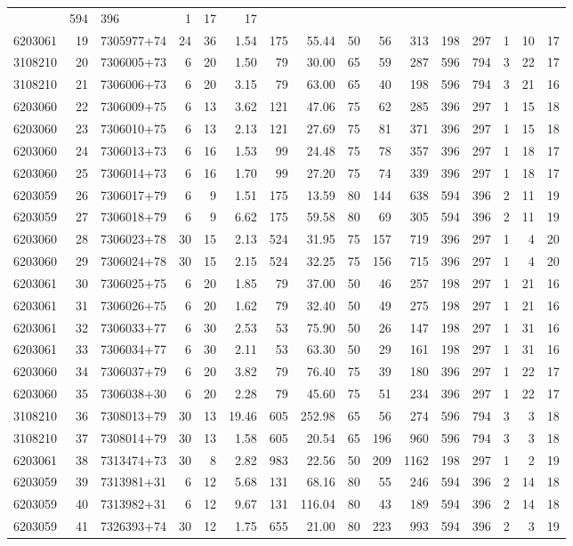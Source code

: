 \documentclass[
]{article}
\begin{document}
\begin{longtable}[]{@{}rrlrrrrrrrrrrrrr@{}}
& 594 & 396 & 1 & 17 & 17\tabularnewline
6203061 & 19 & 7305977+74 & 24 & 36 & 1.54 & 175 & 55.44 & 50 & 56 & 313
& 198 & 297 & 1 & 10 & 17\tabularnewline
3108210 & 20 & 7306005+73 & 6 & 20 & 1.50 & 79 & 30.00 & 65 & 59 & 287 &
596 & 794 & 3 & 22 & 17\tabularnewline
3108210 & 21 & 7306006+73 & 6 & 20 & 3.15 & 79 & 63.00 & 65 & 40 & 198 &
596 & 794 & 3 & 21 & 16\tabularnewline
6203060 & 22 & 7306009+75 & 6 & 13 & 3.62 & 121 & 47.06 & 75 & 62 & 285
& 396 & 297 & 1 & 15 & 18\tabularnewline
6203060 & 23 & 7306010+75 & 6 & 13 & 2.13 & 121 & 27.69 & 75 & 81 & 371
& 396 & 297 & 1 & 15 & 18\tabularnewline
6203060 & 24 & 7306013+73 & 6 & 16 & 1.53 & 99 & 24.48 & 75 & 78 & 357 &
396 & 297 & 1 & 18 & 17\tabularnewline
6203060 & 25 & 7306014+73 & 6 & 16 & 1.70 & 99 & 27.20 & 75 & 74 & 339 &
396 & 297 & 1 & 18 & 17\tabularnewline
6203059 & 26 & 7306017+79 & 6 & 9 & 1.51 & 175 & 13.59 & 80 & 144 & 638
& 594 & 396 & 2 & 11 & 19\tabularnewline
6203059 & 27 & 7306018+79 & 6 & 9 & 6.62 & 175 & 59.58 & 80 & 69 & 305 &
594 & 396 & 2 & 11 & 19\tabularnewline
6203060 & 28 & 7306023+78 & 30 & 15 & 2.13 & 524 & 31.95 & 75 & 157 &
719 & 396 & 297 & 1 & 4 & 20\tabularnewline
6203060 & 29 & 7306024+78 & 30 & 15 & 2.15 & 524 & 32.25 & 75 & 156 &
715 & 396 & 297 & 1 & 4 & 20\tabularnewline
6203061 & 30 & 7306025+75 & 6 & 20 & 1.85 & 79 & 37.00 & 50 & 46 & 257 &
198 & 297 & 1 & 21 & 16\tabularnewline
6203061 & 31 & 7306026+75 & 6 & 20 & 1.62 & 79 & 32.40 & 50 & 49 & 275 &
198 & 297 & 1 & 21 & 16\tabularnewline
6203061 & 32 & 7306033+77 & 6 & 30 & 2.53 & 53 & 75.90 & 50 & 26 & 147 &
198 & 297 & 1 & 31 & 16\tabularnewline
6203061 & 33 & 7306034+77 & 6 & 30 & 2.11 & 53 & 63.30 & 50 & 29 & 161 &
198 & 297 & 1 & 31 & 16\tabularnewline
6203060 & 34 & 7306037+79 & 6 & 20 & 3.82 & 79 & 76.40 & 75 & 39 & 180 &
396 & 297 & 1 & 22 & 17\tabularnewline
6203060 & 35 & 7306038+30 & 6 & 20 & 2.28 & 79 & 45.60 & 75 & 51 & 234 &
396 & 297 & 1 & 22 & 17\tabularnewline
3108210 & 36 & 7308013+79 & 30 & 13 & 19.46 & 605 & 252.98 & 65 & 56 &
274 & 596 & 794 & 3 & 3 & 18\tabularnewline
3108210 & 37 & 7308014+79 & 30 & 13 & 1.58 & 605 & 20.54 & 65 & 196 &
960 & 596 & 794 & 3 & 3 & 18\tabularnewline
6203061 & 38 & 7313474+73 & 30 & 8 & 2.82 & 983 & 22.56 & 50 & 209 &
1162 & 198 & 297 & 1 & 2 & 19\tabularnewline
6203059 & 39 & 7313981+31 & 6 & 12 & 5.68 & 131 & 68.16 & 80 & 55 & 246
& 594 & 396 & 2 & 14 & 18\tabularnewline
6203059 & 40 & 7313982+31 & 6 & 12 & 9.67 & 131 & 116.04 & 80 & 43 & 189
& 594 & 396 & 2 & 14 & 18\tabularnewline
6203059 & 41 & 7326393+74 & 30 & 12 & 1.75 & 655 & 21.00 & 80 & 223 &
993 & 594 & 396 & 2 & 3 & 19\tabularnewline

\end{longtable}
\end{document}

